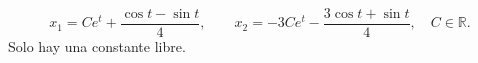 \[x_1=Ce^t+\frac{\cos t-\sin t}{4},\qquad
x_2=-3Ce^t-\frac{3\cos t+\sin t}{4},\quad C\in\mathbb R.\]
Solo hay una constante libre.
